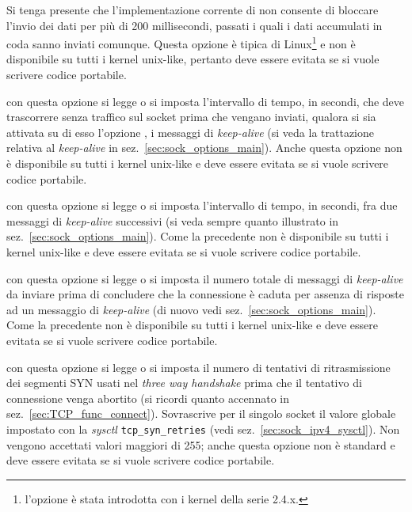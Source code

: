 \begin{basedescript}{\desclabelwidth{1.5cm}\desclabelstyle{\nextlinelabel}}
  Si tenga presente che l'implementazione corrente di  non
  consente di bloccare l'invio dei dati per più di 200 millisecondi, passati i
  quali i dati accumulati in coda sanno inviati comunque.  Questa opzione è
  tipica di Linux\footnote{l'opzione è stata introdotta con i kernel della
    serie 2.4.x.} e non è disponibile su tutti i kernel unix-like, pertanto
  deve essere evitata se si vuole scrivere codice portabile.

\item[\constd{TCP\_KEEPIDLE}] con questa opzione si legge o si imposta
  l'intervallo di tempo, in secondi, che deve trascorrere senza traffico sul
  socket prima che vengano inviati, qualora si sia attivata su di esso
  l'opzione , i messaggi di \textit{keep-alive} (si veda
  la trattazione relativa al \textit{keep-alive} in
  sez.~\ref{sec:sock_options_main}).  Anche questa opzione non è disponibile
  su tutti i kernel unix-like e deve essere evitata se si vuole scrivere
  codice portabile.

\item[\constd{TCP\_KEEPINTVL}] con questa opzione si legge o si imposta
  l'intervallo di tempo, in secondi, fra due messaggi di \textit{keep-alive}
  successivi (si veda sempre quanto illustrato in
  sez.~\ref{sec:sock_options_main}). Come la precedente non è disponibile su
  tutti i kernel unix-like e deve essere evitata se si vuole scrivere codice
  portabile.

\item[\constd{TCP\_KEEPCNT}] con questa opzione si legge o si imposta il numero
  totale di messaggi di \textit{keep-alive} da inviare prima di concludere che
  la connessione è caduta per assenza di risposte ad un messaggio di
  \textit{keep-alive} (di nuovo vedi sez.~\ref{sec:sock_options_main}). Come
  la precedente non è disponibile su tutti i kernel unix-like e deve essere
  evitata se si vuole scrivere codice portabile.

\item[\constd{TCP\_SYNCNT}] con questa opzione si legge o si imposta il numero
  di tentativi di ritrasmissione dei segmenti SYN usati nel \textit{three way
    handshake} prima che il tentativo di connessione venga abortito (si
  ricordi quanto accennato in sez.~\ref{sec:TCP_func_connect}). Sovrascrive
  per il singolo socket il valore globale impostato con la \textit{sysctl}
  \texttt{tcp\_syn\_retries} (vedi sez.~\ref{sec:sock_ipv4_sysctl}).  Non
  vengono accettati valori maggiori di 255; anche questa opzione non è
  standard e deve essere evitata se si vuole scrivere codice portabile.


\end{basedescript}

